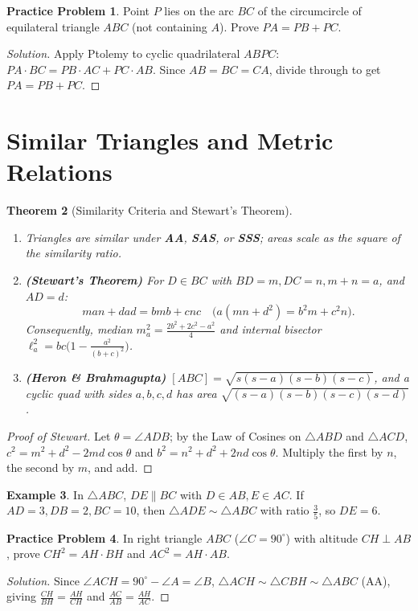 \documentclass[11pt]{article}
\theoremstyle{plain}
\newtheorem{theorem}{Theorem}[section]
\theoremstyle{definition}
\newtheorem{example}[theorem]{Example}
\newtheorem{problem}[theorem]{Practice Problem}
\newenvironment{solution}{\begin{proof}[Solution]}{\end{proof}}
\begin{document}
\begin{problem}
Point $P$ lies on the arc $BC$ of the circumcircle of equilateral triangle
$ABC$ (not containing $A$). Prove $PA = PB + PC$.
\end{problem}
\begin{solution}
Apply Ptolemy to cyclic quadrilateral $ABPC$:
$PA \cdot BC = PB \cdot AC + PC \cdot AB$. Since $AB=BC=CA$, divide through to
get $PA = PB + PC$.
\end{solution}

\section{Similar Triangles and Metric Relations}

\begin{theorem}[Similarity Criteria and Stewart's Theorem]
\leavevmode
\begin{enumerate}[label=(\alph*)]
\item Triangles are similar under \textbf{AA}, \textbf{SAS}, or \textbf{SSS}; areas scale as the square of the similarity ratio.
\item \textbf{(Stewart's Theorem)} For $D \in BC$ with $BD=m, DC=n, m+n=a$, and $AD=d$:
\[
man + dad = bmb + cnc \quad \bigl(a(mn + d^2) = b^2 m + c^2 n\bigr).
\]
Consequently, median $m_a^2 = \frac{2b^2+2c^2-a^2}{4}$ and internal bisector $\ell_a^2 = bc\bigl(1 - \frac{a^2}{(b+c)^2}\bigr)$.
\item \textbf{(Heron \& Brahmagupta)} $[ABC] = \sqrt{s(s-a)(s-b)(s-c)}$, and a cyclic quad with sides $a,b,c,d$ has area $\sqrt{(s-a)(s-b)(s-c)(s-d)}$.
\end{enumerate}
\end{theorem}
\begin{proof}[Proof of Stewart]
Let $\theta = \angle ADB$; by the Law of Cosines on $\triangle ABD$ and $\triangle ACD$, $c^2 = m^2+d^2-2md\cos\theta$ and $b^2 = n^2+d^2+2nd\cos\theta$. Multiply the first by $n$, the second by $m$, and add.
\end{proof}

\begin{example}
In $\triangle ABC$, $DE \parallel BC$ with $D\in AB, E\in AC$. If $AD=3, DB=2, BC=10$, then $\triangle ADE \sim \triangle ABC$ with ratio $\frac{3}{5}$, so $DE = 6$.
\end{example}

\begin{problem}
In right triangle $ABC$ ($\angle C = 90^\circ$) with altitude $CH \perp AB$, prove $CH^2 = AH \cdot BH$ and $AC^2 = AH \cdot AB$.
\end{problem}
\begin{solution}
Since $\angle ACH = 90^\circ - \angle A = \angle B$, $\triangle ACH \sim \triangle CBH \sim \triangle ABC$ (AA), giving $\frac{CH}{BH}=\frac{AH}{CH}$ and $\frac{AC}{AB}=\frac{AH}{AC}$.
\end{solution}
\end{document}

